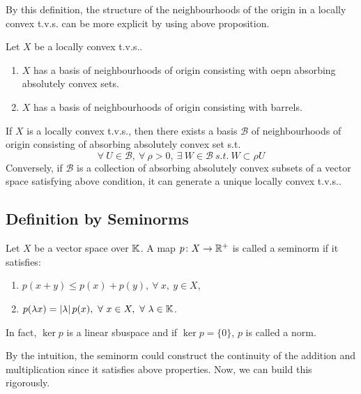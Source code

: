 \documentclass[a4paper,11pt]{report}
\begin{document}
By this definition, the structure of the neighbourhoods of the origin in a locally convex t.v.s. can be more explicit by using above proposition.

\begin{prop}
	Let $X$ be a locally convex t.v.s..
	\begin{enumerate}[label=\arabic*)]
		\item $X$ has a basis of neighbourhoods of origin consisting with oepn absorbing absolutely convex sets.
		\item  $X$ has a basis of neighbourhoods of origin consisting with barrels.
	\end{enumerate}
\end{prop}

\begin{thm}
	If $X$ is a locally convex t.v.s., then there exists a basis $\mathscr{B}$ of neighbourhoods of origin consisting of absorbing absolutely convex set s.t.
	\begin{equation*}
		\forall ~ U \in \mathscr{B},~ \forall ~ \rho > 0,~ \exists ~ W \in \mathscr{B} ~s.t.~ W \subset \rho U
	\end{equation*}
	Conversely, if $\mathscr{B}$ is a collection of absorbing absolutely convex subsets of a vector space satisfying above condition, it can generate a unique locally convex t.v.s..
\end{thm}

\subsection{Definition by Seminorms}

\begin{defn}
	Let $X$ be a vector space over $\mathbb{K}$. A map $p \colon X \rightarrow \mathbb{R}^{+}$ is called a seminorm if it satisfies:
	\begin{enumerate}[label=\arabic*)]
		\item $p(x+y) \leqslant p(x)+p(y),~ \forall ~ x,~ y \in X$,
		\item $p(\lambda x) = \left\lvert\lambda\right\lvert p(x),~ \forall ~ x \in X,~ \forall ~ \lambda \in \mathbb{K}$.
	\end{enumerate}
\end{defn}
\begin{rem}
	In fact, $\ker{p}$ is a linear sbuspace and if $\ker{p} = \{0\}$, $p$ is called a norm.
\end{rem}

By the intuition, the seminorm could construct the continuity of the addition and multiplication since it satisfies above properties. Now, we can build this rigorously.
\end{document}
